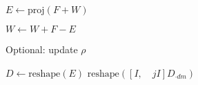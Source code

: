 \documentclass{article}
\begin{document}
\begin{algorithm}
\begin{algorithmic}[]
    \item $E \leftarrow \text{proj}( F + W)$ 
    \item $W \leftarrow W + F - E$ 
    \item Optional: update $\rho$
    \ENDFOR
    \item $D \leftarrow \text{reshape}(E)$
\ENDFOR
\RETURN $\text{reshape}([I, \quad jI] D_{\cdot dm})$
\end{algorithmic}
\end{algorithm}
\end{document}
